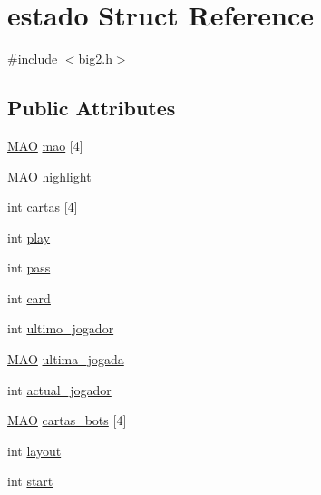 \hypertarget{structestado}{\section{estado Struct Reference}
\label{structestado}
}


{\ttfamily \#include $<$big2.\-h$>$}

\subsection*{Public Attributes}
\begin{DoxyCompactItemize}
\item 
\hyperlink{big2_8h_a525a5fe381e0742a211c7dbcfd4e2419}{M\-A\-O} \hyperlink{structestado_a69ee2cdf37e53968050df5c4b8e2cf51}{mao} \mbox{[}4\mbox{]}
\item 
\hyperlink{big2_8h_a525a5fe381e0742a211c7dbcfd4e2419}{M\-A\-O} \hyperlink{structestado_a4ce43292ae41de8f331b21724675d23f}{highlight}
\item 
int \hyperlink{structestado_a1108e4a26e3cd7ed12209927c5afaa2d}{cartas} \mbox{[}4\mbox{]}
\item 
int \hyperlink{structestado_a594b925e4cb17da72275fbf44d620f30}{play}
\item 
int \hyperlink{structestado_a8953eb970b94ff6087eb596f09d0ff94}{pass}
\item 
int \hyperlink{structestado_a094ab44a32a5834cdbd0fdb11de09773}{card}
\item 
int \hyperlink{structestado_acb67e3c2edb271ab6fa1139396c5e247}{ultimo\-\_\-jogador}
\item 
\hyperlink{big2_8h_a525a5fe381e0742a211c7dbcfd4e2419}{M\-A\-O} \hyperlink{structestado_adbe7db5c55b9ffff331f0a551a8c0212}{ultima\-\_\-jogada}
\item 
int \hyperlink{structestado_ad42dcb5270a9c61c0c34340995a5db52}{actual\-\_\-jogador}
\item 
\hyperlink{big2_8h_a525a5fe381e0742a211c7dbcfd4e2419}{M\-A\-O} \hyperlink{structestado_a761537e3607a9604c219fdf2962dc923}{cartas\-\_\-bots} \mbox{[}4\mbox{]}
\item 
int \hyperlink{structestado_a7afaa27a28ae75993af48cc956e61b87}{layout}
\item 
int \hyperlink{structestado_a20ecce4f918a139a722514d4852dda20}{start}
\end{DoxyCompactItemize}


